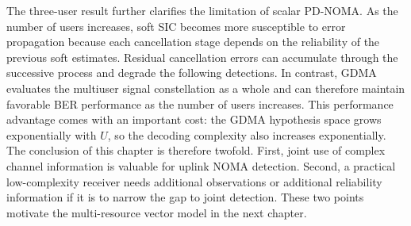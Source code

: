 The three-user result further clarifies the limitation of scalar PD-NOMA. As the number of users increases, soft SIC becomes more susceptible to error propagation because each cancellation stage depends on the reliability of the previous soft estimates. Residual cancellation errors can accumulate through the successive process and degrade the following detections. In contrast, GDMA evaluates the multiuser signal constellation as a whole and can therefore maintain favorable BER performance as the number of users increases. This performance advantage comes with an important cost: the GDMA hypothesis space grows exponentially with $U$, so the decoding complexity also increases exponentially. The conclusion of this chapter is therefore twofold. First, joint use of complex channel information is valuable for uplink NOMA detection. Second, a practical low-complexity receiver needs additional observations or additional reliability information if it is to narrow the gap to joint detection. These two points motivate the multi-resource vector model in the next chapter.
